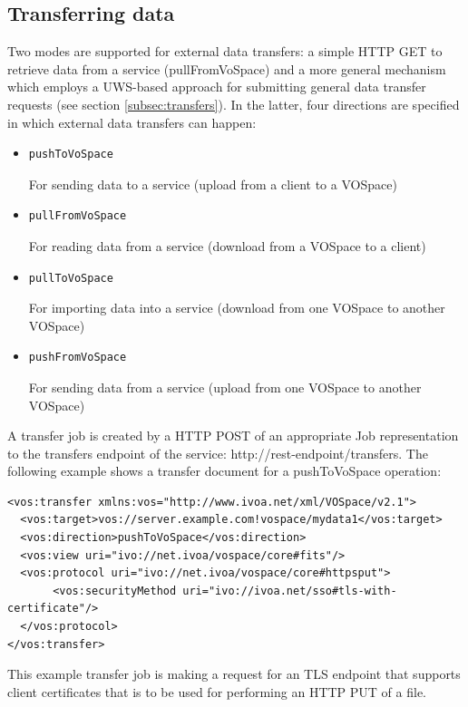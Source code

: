 \documentclass[11pt,a4paper]{ivoa}
\begin{document}
\subsection{Transferring data}
\label{subsec:transferringdata}
Two modes are supported for external data transfers: a simple HTTP GET to retrieve data from a service (pullFromVoSpace) and a more general mechanism which employs a UWS-based approach \citep{std:UWS} for submitting general data transfer requests (see section \ref{subsec:transfers}). In the latter, four directions are specified in which external data transfers can happen:
\begin{itemize}
    \item \begin{verbatim}pushToVoSpace\end{verbatim} For sending data to a service (upload from a client to a VOSpace)
    \item \begin{verbatim}pullFromVoSpace\end{verbatim} For reading data from a service (download from a VOSpace to a client)
    \item \begin{verbatim}pullToVoSpace\end{verbatim} For importing data into a service (download from one VOSpace to another VOSpace)
    \item \begin{verbatim}pushFromVoSpace\end{verbatim} For sending data from a service (upload from one VOSpace to another VOSpace)
\end{itemize}

A transfer job is created by a HTTP POST of an appropriate Job representation to the transfers endpoint of the service: http://rest-endpoint/transfers.  The following example shows a transfer document for a pushToVoSpace operation:

\begin{lstlisting}
<vos:transfer xmlns:vos="http://www.ivoa.net/xml/VOSpace/v2.1">   
  <vos:target>vos://server.example.com!vospace/mydata1</vos:target>
  <vos:direction>pushToVoSpace</vos:direction>
  <vos:view uri="ivo://net.ivoa/vospace/core#fits"/>
  <vos:protocol uri="ivo://net.ivoa/vospace/core#httpsput">
       <vos:securityMethod uri="ivo://ivoa.net/sso#tls-with-certificate"/>
  </vos:protocol>
</vos:transfer>
\end{lstlisting}

This example transfer job is making a request for an TLS endpoint that supports client certificates that is to be used for performing an HTTP PUT of a file.  
\end{document}
